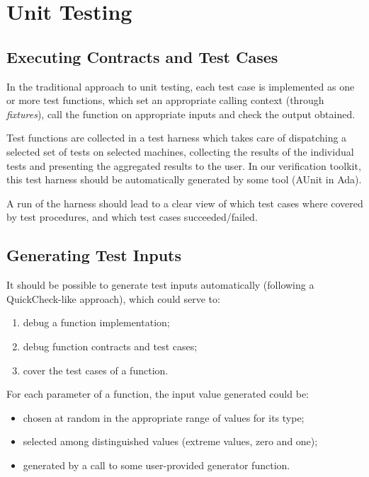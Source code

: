 \documentclass{article}
\begin{document}
\section{Unit Testing}

\subsection{Executing Contracts and Test Cases}

In the traditional approach to unit testing, each test case is implemented as
one or more test functions, which set an appropriate calling context (through
\emph{fixtures}), call the function on appropriate inputs and check the output
obtained.

Test functions are collected in a test harness which takes care of dispatching
a selected set of tests on selected machines, collecting the results of the
individual tests and presenting the aggregated results to the user. In our
verification toolkit, this test harness should be automatically generated by
some tool (AUnit in Ada).

A run of the harness should lead to a clear view of which test cases where
covered by test procedures, and which test cases succeeded/failed.

\subsection{Generating Test Inputs}

It should be possible to generate test inputs automatically (following a
QuickCheck-like approach), which could serve to:
\begin{enumerate}
\item debug a function implementation;
\item debug function contracts and test cases;
\item cover the test cases of a function.
\end{enumerate}

For each parameter of a function, the input value generated could be:
\begin{itemize}
\item chosen at random in the appropriate range of values for its type;
\item selected among distinguished values (extreme values, zero and one);
\item generated by a call to some user-provided generator function.
\end{itemize}
\end{document}
